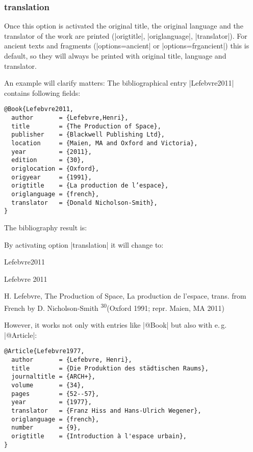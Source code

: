 \documentclass[a4paper,
10pt,
greek,
french,
spanish,
italian,
ngerman,
english
]{ltxdoc}
\begin{document}
\subsubsection{translation}\label{translation}
Once this option is activated the original title, the original language and the translator of the work are printed (|origtitle|, |origlanguage|, |translator|).
For ancient texts and fragments (|options={ancient}| or |options={frgancient}|) this is default, 
so they will always be printed with original title, language and translator.

An example will clarify matters:
The bibliographical entry |Lefebvre2011| contains following fields:
\begin{lstlisting}[style=bibentry,label=Lefebvre2011,caption={{@}Book\{Lefebvre2011,…\}}]
@Book{Lefebvre2011,
  author       = {Lefebvre,Henri},
  title        = {The Production of Space},
  publisher    = {Blackwell Publishing Ltd},
  location     = {Maien, MA and Oxford and Victoria},
  year         = {2011},
  edition      = {30},
  origlocation = {Oxford},
  origyear     = {1991},
  origtitle    = {La production de l’espace},
  origlanguage = {french},
  translator   = {Donald Nicholson-Smith},
}
\end{lstlisting}

The bibliography result is:

By activating option |translation| it will change to:

\begin{bibbsp}{Lefebvre2011}%
\parbox[t]{2cm}{Lefebvre 2011} \parbox[t]{9cm}{H. Lefebvre,  The Production of Space, 
{\color{red} La production de l’espace, trans. from French by D. Nicholson-Smith} \textsuperscript{30}(Oxford 1991; repr. Maien, MA 2011)}
\end{bibbsp}
 
However, it works not only with entries like |@Book| but also with e.\,g. |@Article|:

\begin{lstlisting}[style=bibentry,label=Lefebvre1977,caption={{@}Article\{Lefebvre1977,…\} }]
@Article{Lefebvre1977,
  author       = {Lefebvre, Henri},
  title        = {Die Produktion des städtischen Raums},
  journaltitle = {ARCH+},
  volume       = {34},
  pages        = {52--57},
  year         = {1977},
  translator   = {Franz Hiss and Hans-Ulrich Wegener},
  origlanguage = {french},
  number       = {9},
  origtitle    = {Introduction à l'espace urbain},
}
\end{lstlisting}
\end{document}
